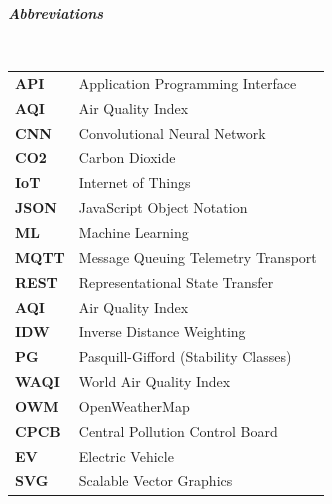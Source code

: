 \documentclass[a4paper, 12pt]{report}
\begin{document}
\thispagestyle{empty}
\begin{center}
	\begin{LARGE}
		\textbf{\textit {Abbreviations}}\end{LARGE}\\[1.2cm]
\end{center}
\begin{table}[h]
	\begin{tabular}{ll}			
		\textbf{API} & Application Programming Interface \\
		\textbf{AQI} & Air Quality Index \\
		\textbf{CNN} & Convolutional Neural Network \\
		\textbf{CO2} & Carbon Dioxide \\
		\textbf{IoT} & Internet of Things \\
		\textbf{JSON} & JavaScript Object Notation \\
		\textbf{ML} & Machine Learning \\
		\textbf{MQTT} & Message Queuing Telemetry Transport \\
		\textbf{REST} & Representational State Transfer \\
		\textbf{AQI} & Air Quality Index \\
		\textbf{IDW} & Inverse Distance Weighting \\
		\textbf{PG} & Pasquill-Gifford (Stability Classes) \\
		\textbf{WAQI} & World Air Quality Index \\
		\textbf{OWM} & OpenWeatherMap \\
		\textbf{CPCB} & Central Pollution Control Board \\
		\textbf{EV} & Electric Vehicle \\
		\textbf{SVG} & Scalable Vector Graphics \\
	\end{tabular}
\end{table}
\newpage

\setcounter{page}{1}
\tableofcontents
\newpage
{}

\end{document}

